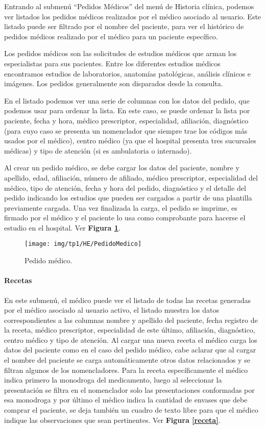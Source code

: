 Entrando al submenú ``Pedidos Médicos'' del menú de Historia clínica, podemos ver listados los pedidos médicos realizados por el médico asociado al usuario.
Este listado puede ser filtrado por el nombre del paciente, para ver el histórico de pedidos médicos realizado por el médico para un paciente específico.

Los pedidos médicos son las solicitudes de estudios médicos que arman los especialistas para sus pacientes.
Entre los diferentes estudios médicos encontramos estudios de laboratorios, anatomías patológicas, análisis clínicos e imágenes. Los pedidos generalmente son disparados desde la consulta.

En el listado podemos ver una serie de columnas con los datos del pedido, que podemos usar para ordenar la lista.
En este caso, se puede ordenar la lista por paciente, fecha y hora, médico prescriptor, especialidad, afiliación, diagnóstico (para cuyo caso se presenta un nomenclador que siempre trae los códigos más usados por el médico), centro médico (ya que el hospital presenta tres sucursales médicas) y tipo de atención (si es ambulatoria o internado).

Al crear un pedido médico, se debe cargar los datos del paciente, nombre y apellido, edad, afiliación, número de afiliado, médico prescriptor, especialidad del médico, tipo de atención, fecha y hora del pedido, diagnóstico y el detalle del pedido indicando los estudios que pueden ser cargados a partir de una plantilla previamente cargada. Una vez finalizada la carga, el pedido se imprime, es firmado por el médico y el paciente lo usa como comprobante para hacerse el estudio en el hospital. Ver \textbf{Figura \ref{pedido-medico}}.

\begin{figure}[h]
      \centering
      \texttt{[image: img/tp1/HE/PedidoMedico]}
      \caption{Pedido médico.}
      \label{pedido-medico}
\end{figure}


\paragraph{Recetas}

En este submenú, el médico puede ver el listado de todas las recetas generadas por el médico asociado al usuario activo, el listado muestra los datos correspondientes a las columnas nombre y apellido del paciente, fecha registro de la receta, médico prescriptor, especialidad de este último, afiliación, diagnóstico, centro médico y tipo de atención. Al cargar una nueva receta el médico carga los datos del paciente como en el caso del pedido médico, cabe aclarar que al cargar el nombre del paciente se carga automáticamente otros datos relacionados y se filtran algunos de los nomencladores. Para la receta específicamente el médico indica primero la monodroga del medicamento, luego al seleccionar la presentación se filtra en el nomenclador solo las presentaciones conformadas por esa monodroga y por último el médico indica la cantidad de envases que debe comprar el paciente, se deja también un cuadro de texto libre para que el médico indique las observaciones que sean pertinentes. Ver \textbf{Figura \ref{receta}}.


